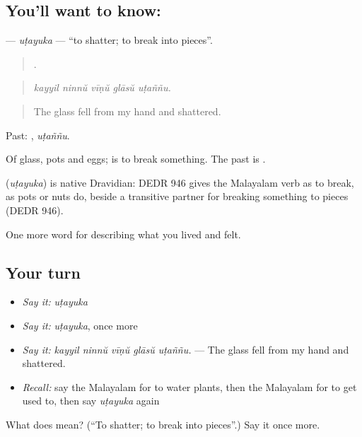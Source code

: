 \subsection*{You'll want to know: }
\textbf{} — \emph{uṭayuka} — \textquotedblleft{}to shatter; to break into pieces\textquotedblright{}.

\begin{quote}
    .
\end{quote}

\begin{quote}
\emph{kayyil ninnŭ vīṇŭ glāsŭ uṭaññu.}
\end{quote}

\begin{quote}
The glass fell from my hand and shattered.
\end{quote}

Past: , \emph{uṭaññu}.

Of glass, pots and eggs;  is to break something. The past is .

\begin{cousinweb}
\textbf{} (\emph{uṭayuka}) is native Dravidian: DEDR 946 gives the Malayalam verb as to break, as pots or nuts do, beside a transitive partner for breaking something to pieces (DEDR 946).
\end{cousinweb}

\begin{grammarlens}[title={What you've built}]
One more word for describing what you lived and felt.
\end{grammarlens}

\subsection*{Your turn}
\begin{itemize}
\raggedright
  \item \emph{Say it:} \emph{uṭayuka}
  \item \emph{Say it:} \emph{uṭayuka}, once more
  \item \emph{Say it:} \emph{kayyil ninnŭ vīṇŭ glāsŭ uṭaññu.} — The glass fell from my hand and shattered.
  \item \emph{Recall:} say the Malayalam for to water plants, then the Malayalam for to get used to, then say \emph{uṭayuka} again
\end{itemize}

\begin{tcolorbox}[breakable,colback=teal!4,colframe=teal!35!black,title={Before you move on}]
What does  mean? (\textquotedblleft{}To shatter; to break into pieces\textquotedblright{}.) Say it once more.
\end{tcolorbox}
